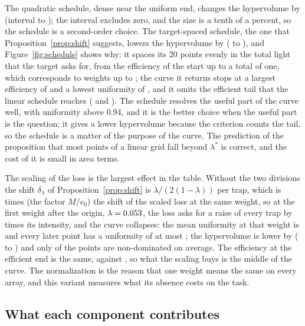 The quadratic schedule, dense near the uniform end, changes the hypervolume by \ablQuadDiff{} (interval \ablQuadDiffLo{} to \ablQuadDiffHi); the interval excludes zero, and the size is a tenth of a percent, so the schedule is a second-order choice. The target-spaced schedule, the one that Proposition~\ref{prop:shift} suggests, lowers the hypervolume by \ablTargetDiff{} (\ablTargetDiffLo{} to \ablTargetDiffHi), and Figure~\ref{fig:schedule} shows why: it spaces its 20 points evenly in the total light that the target asks for,
from the efficiency of the start up to a total of one, which corresponds to weights up to \ablTargetLamMax{}; the curve it returns stops at a largest efficiency of \ablTargetEMax{} and a lowest uniformity of \ablTargetUMin{}, and it omits the efficient tail that the linear schedule reaches (\ablDefaultEMax{} and \ablDefaultUMin{}). The schedule resolves the useful part of the curve well, with uniformity above 0.94, and it is the better choice
when the useful part is the question; it gives a lower hypervolume because the criterion counts the tail, so the schedule is a matter of the purpose of the curve. The prediction of the proposition that most points of a linear grid fall beyond $\lambda^\ast$ is correct, and the cost of it is small in area terms.

The scaling of the loss is the largest effect in the table. Without the two divisions the shift $\delta_\lambda$ of Proposition~\ref{prop:shift} is $\lambda/(2(1-\lambda))$ per trap, which is \rawFactor{} times (the factor $M/e_0$) the shift of the scaled loss at the same weight, so at the first weight after the origin, $\lambda=0.053{}$, the loss asks for a raise of every trap by \rawShiftRel{} times its intensity, and the curve collapses: the mean uniformity at that weight is \ablRawFirstU{} and every later point has a uniformity of at most \ablRawLaterU{}; the hypervolume is lower by \ablRawDiff{} (\ablRawDiffLo{} to \ablRawDiffHi) and only \ablRawNPar{} of the points are non-dominated on average. The efficiency
at the efficient end is the same, \ablRawEMax{} against \ablDefaultEMax{}, so what the scaling buys is the middle of the curve. The normalization is the reason that one weight means the same on every array, and this variant measures what its absence costs on the task.

\subsection{What each component contributes}\label{sec:abl-summary}

